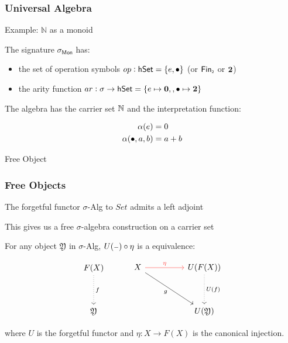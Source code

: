 \documentclass[9pt]{beamer}
\begin{document}
\begin{frame}
\frametitle{Universal Algebra}
Example: $\mathbb{N}$ as a \alert{monoid}

The signature $\sigma_{\mathsf{Mon}}$ has:
\begin{itemize}
    \item the set of \alert{operation symbols} $op : \mathsf{hSet} = \{e, \bullet\}$ (or $\Fin[2]$ or ${\mathbf{2}}$)
    \item the \alert{arity function} $ar : \sigma \rightarrow \mathsf{hSet} = \{e \mapsto \mathbf{0},, \bullet \mapsto {\mathbf{2}}\}$
\end{itemize}

The algebra has the carrier set $\mathbb{N}$ and the interpretation function:

\begin{align*}
\alpha(e) & = 0 \\
\alpha(\bullet, a, b) & = a + b 
\end{align*} 


\end{frame}


\begin{frame}{Free Object}
\frametitle{Free Objects}

The forgetful functor $\sigma$-Alg to $Set$ admits a left adjoint

This gives us a free $\sigma$-algebra construction on a carrier set

\begin{dblock}
For any object \( \mathfrak{Y} \) in $\sigma$-Alg, $U({\scriptstyle{-}}) \circ \eta$ is a equivalence:

\[
\begin{tikzcd}[ampersand replacement=\&]
	F(X) \\
	\\
	\mathfrak{Y}
	\arrow["f", dotted, from=1-1, to=3-1]
\end{tikzcd}
\hspace{1cm}
\begin{tikzcd}[ampersand replacement=\&]
	X \&\& {U(F(X))} \\
	\\
	\&\& {U(\mathfrak{Y})}
	\arrow["\eta", color={rgb,255:red,255;green,54;blue,51}, from=1-1, to=1-3]
	\arrow["g"', from=1-1, to=3-3]
	\arrow["{U(f)}", dotted, from=1-3, to=3-3]
\end{tikzcd}\]

where $U$ is the forgetful functor and $\eta : X \rightarrow F(X)$ is the canonical injection.
\end{dblock}

\end{frame}
\end{document}
